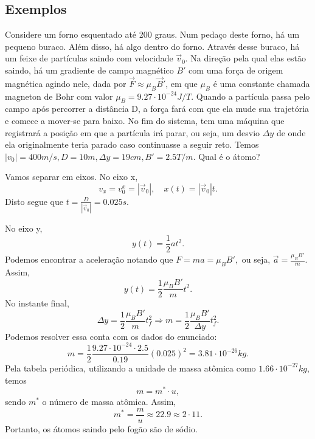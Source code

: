\documentclass[physics_notes.tex]{subfiles}
\begin{document}
\subsection{Exemplos}
\begin{example}
	Considere um forno esquentado até 200 graus. Num pedaço deste forno, há um pequeno buraco. Além disso, há algo dentro do forno.
	Através desse buraco, há um feixe de partículas saindo com velocidade $\vec{v}_{0}$. Na direção pela qual elas estão saindo,
	há um gradiente de campo magnético $B'$ com uma força de origem magnética agindo nele, dada por $\vec{F}\approx \mu_{B}\vec{B}'$,
	em que $\mu_{B}$ é uma constante chamada magneton de Bohr com valor $\mu_{B}=9.27 \cdot 10^{-24}J/T.$ Quando a partícula passa pelo
	campo após percorrer a distância D, a força fará com que ela mude sua trajetória e comece a mover-se para baixo. No fim do sistema, tem uma máquina
	que registrará a posição em que a partícula irá parar, ou seja, um desvio $\Delta y$ de onde ela originalmente
	teria parado caso continuasse a seguir reto.
	Temos $|v_{0}|=400m/s, D = 10m, \Delta y = 19cm, B' = 2.5T/m.$ Qual é o átomo?

	Vamos separar em eixos. No eixo x,
	$$
		v_{x} = v_{0}^{x} = |\vec{v}_{0}|,\quad x(t) = |\vec{v}_{0}|t.
	$$
	Disto segue que $t = \frac{D}{|\vec{v}_{0}|} = 0.025s.$

	No eixo y,
	$$
		y(t) = \frac{1}{2}at^{2}.
	$$
	Podemos encontrar a aceleração notando que $F = ma = \mu_{B}B',$ ou seja, $\vec{a} = \frac{\mu_{B}B'}{m}$. Assim,
	$$
		y(t) = \frac{1}{2}\frac{\mu_{B}B'}{m}t^{2}.
	$$
	No instante final,
	$$
		\Delta y=\frac{1}{2}\frac{\mu_{B}B'}{m}t_{f}^{2} \Rightarrow m = \frac{1}{2}\frac{\mu_{B}B'}{\Delta y}t_{f}^{2}.
	$$
	Podemos resolver essa conta com os dados do enunciado:
	$$
		m = \frac{1}{2}\frac{9.27 \cdot 10^{-24}\cdot 2.5}{0.19}(0.025)^{2} = 3.81 \cdot 10^{-26}kg.
	$$
	Pela tabela periódica, utilizando a unidade de massa atômica como $1.66 \cdot 10^{-27}kg,$ temos
	$$
		m = m^{*}\cdot u,
	$$
	sendo $m^{*}$ o número de massa atômica. Assim,
	$$
		m^{*} = \frac{m}{u}\approx 22.9\approx 2 \cdot 11.
	$$
	Portanto, os átomos saindo pelo fogão são de sódio.
\end{example}
\end{document}
